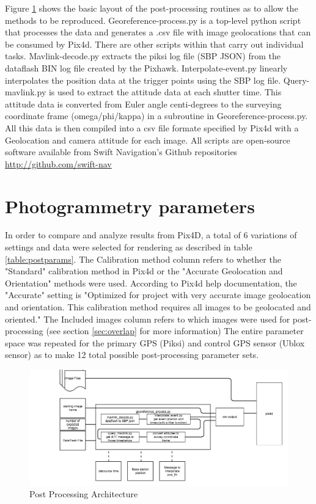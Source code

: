 \documentclass{article}
\begin{document}
Figure \ref{postprocess} shows the basic layout of the post-processing routines as to allow the methods to be reproduced.  Georeference-process.py is a top-level python script that processes the data and generates a .csv file with image geolocations that can be consumed by Pix4d. There are other scripts within that carry out individual tasks. Mavlink-decode.py extracts the piksi log file (SBP JSON) from the dataflash BIN log file created by the Pixhawk. Interpolate-event.py linearly interpolates the position data at the trigger points using the SBP log file. Query-mavlink.py is used to extract the attitude data at each shutter time. This attitude data is converted from Euler angle centi-degrees to the surveying coordinate frame (omega/phi/kappa) in a subroutine in Georeference-process.py. All this data is then compiled into a csv file formate specified by Pix4d with a Geolocation and camera attitude for each image.  All scripts are open-source software available from Swift Navigation's Github repositories \url{http://github.com/swift-nav}
\section{Photogrammetry parameters}
In order to compare and analyze results from Pix4D, a total of 6 variations of settings and data were selected for rendering as described in table \ref{table:postparams}.  The Calibration method column refers to whether the "Standard" calibration method in Pix4d or the "Accurate Geolocation and Orientation" methods were used.  According to Pix4d help documentation, the "Accurate" setting is "Optimized for project with very accurate image geolocation and orientation. This calibration method requires all images to be geolocated and oriented."\cite{pix4d_support1}  The Included images column refers to which images were used for post-processing (see section \ref{sec:overlap} for more information)
The entire parameter space was repeated for the primary GPS (Piksi) and control GPS sensor (Ublox sensor) as to make 12 total possible post-processing parameter sets.


\begin{figure}
\includegraphics[width=7in]{images/flow_charts/uav_survey_processing_architecture.png}
\caption{Post Processing Architecture}
\label{postprocess}
\end{figure}
\end{document}
